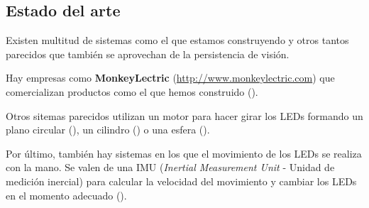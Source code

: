 \subsection{Estado del arte}
Existen multitud de sistemas como el que estamos construyendo y otros tantos
parecidos que también se aprovechan de la persistencia de visión.

Hay empresas como \textbf{MonkeyLectric} (\url{http://www.monkeylectric.com})
que comercializan productos como el que hemos construido
().

Otros sitemas parecidos utilizan un motor para hacer girar los LEDs formando
un plano circular (), un cilindro () o
una esfera ().

Por último, también hay sistemas en los que el movimiento de los LEDs se realiza
con la mano. Se valen de una IMU (\textsl{Inertial Measurement Unit} - Unidad de
medición inercial) para calcular la velocidad del movimiento y cambiar los LEDs
en el momento adecuado ().

